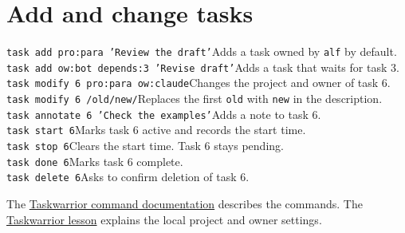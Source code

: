 \documentclass[11pt,a4paper]{article}
\begin{document}
\section*{Add and change tasks}

\begin{flushleft}
\texttt{\textcolor{cmd}{task} \textcolor{sub}{add} \textcolor{attr}{pro:para} \textcolor{desc}{'Review the draft'}}\quad Adds a task owned by \texttt{alf} by default. \\
\texttt{\textcolor{cmd}{task} \textcolor{sub}{add} \textcolor{attr}{ow:bot} \textcolor{attr}{depends:3} \textcolor{desc}{'Revise draft'}}\quad Adds a task that waits for task 3. \\
\texttt{\textcolor{cmd}{task} \textcolor{sub}{modify} 6 \textcolor{attr}{pro:para} \textcolor{attr}{ow:claude}}\quad Changes the project and owner of task 6. \\
\texttt{\textcolor{cmd}{task} \textcolor{sub}{modify} 6 /old/new/}\quad Replaces the first \texttt{old} with \texttt{new} in the description. \\
\texttt{\textcolor{cmd}{task} \textcolor{sub}{annotate} 6 \textcolor{desc}{'Check the examples'}}\quad Adds a note to task 6. \\
\texttt{\textcolor{cmd}{task} \textcolor{sub}{start} 6}\quad Marks task 6 active and records the start time. \\
\texttt{\textcolor{cmd}{task} \textcolor{sub}{stop} 6}\quad Clears the start time. Task 6 stays pending. \\
\texttt{\textcolor{cmd}{task} \textcolor{sub}{done} 6}\quad Marks task 6 complete. \\
\texttt{\textcolor{cmd}{task} \textcolor{sub}{delete} 6}\quad Asks to confirm deletion of task 6. \\
\end{flushleft}


The \href{https://taskwarrior.org/docs/commands/}{Taskwarrior command documentation} describes the commands. The \href{https://github.com/Atcold/learning-with-claude/tree/61f884fe05f5710863ebbc6eb2675a5858324583/taskwarrior}{Taskwarrior lesson} explains the local project and owner settings.

\revisiontable
\end{document}
